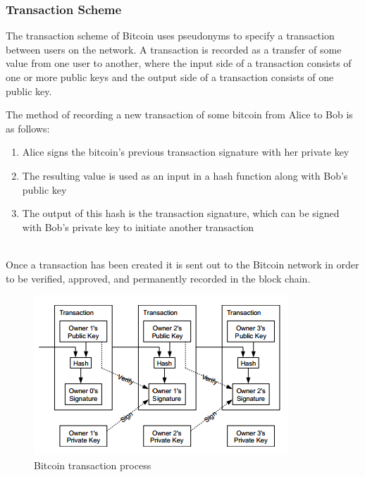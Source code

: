 \documentclass[11pt]{article}
\begin{document}
\subsubsection{Transaction Scheme} The transaction scheme of Bitcoin uses pseudonyms to specify a transaction between
users on the network. A transaction is recorded as a transfer of some value from one user to another, where the input
side of a transaction consists of one or more public keys and the output side of a transaction consists of one public
key.
\vspace{1em}\\
\begin{minipage}{\linewidth}
    The method of recording a new transaction of some bitcoin from Alice
    to Bob is as follows:
    \begin{enumerate}
        \item Alice signs the bitcoin's previous transaction signature with her private key
        \item The resulting value is used as an input in a hash function along with Bob's public key
        \item The output of this hash is the transaction signature, which can be signed with Bob's private key to
            initiate another transaction
    \end{enumerate}
\end{minipage}
\vspace{1em}\\
Once a transaction has been created it is sent out to the Bitcoin network in order to be verified, approved, and
permanently recorded in the block chain.

\begin{figure}[H]
    \centering
    \caption[Bitcoin transaction process]{Bitcoin transaction process~\cite{nakamoto08}}
    \includegraphics[width=.9\textwidth]{figures/transaction.png}
\end{figure}
\end{document}
